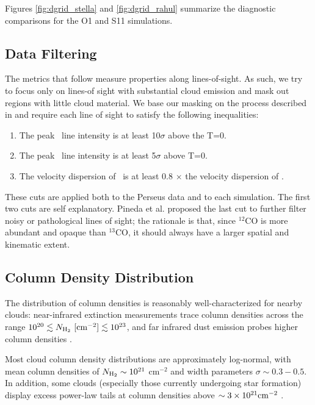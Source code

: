 Figures \ref{fig:dgrid_stella} and \ref{fig:dgrid_rahul} summarize the diagnostic comparisons for the O1 and S11 simulations.

\subsection{Data Filtering}
The metrics that follow measure properties along lines-of-sight. As such, we try to focus only on lines-of sight with substantial cloud emission and mask out
regions with little cloud material. We base our masking on the process described in \cite{http://adsabs.harvard.edu/abs/2008ApJ...679..481P} and require
each line of sight to satisfy the following inequalities:

\begin{enumerate}
\item The peak  \coa\, line intensity is at least 10$\sigma$ above the T=0.
\item The peak \coc\, line intensity is at least 5$\sigma$ above T=0.
\item The velocity dispersion of \coa\, is at least 0.8 $\times$ the velocity dispersion of \coc.
\end{enumerate}

These cuts are applied both to the Perseus data and to each simulation. The first two cuts are self explanatory. Pineda et al. proposed the last cut to further filter noisy or pathological lines of sight; the rationale is that, since $^{12}$CO is more abundant and opaque than $^{13}$CO, it should always have a larger spatial and kinematic extent.

\subsection{Column Density Distribution}
The distribution of column densities is reasonably well-characterized for nearby clouds: near-infrared extinction measurements trace column densities
across the range $10^{20} \lesssim N_{\rm H_2}~  [{\rm cm}^{-2}]  \lesssim 10^{23} $, and far infrared dust emission probes higher column densities \citep{http://adsabs.harvard.edu/abs/2009ApJ...692...91G, http://adsabs.harvard.edu/abs/2012ApJ...752...55K, 2009A&A...493..735L, 2009A&A...508L..35K}.

Most cloud column density distributions are approximately log-normal, with mean column densities of $N_{\rm H_2} \sim 10^{21}$ cm$^{-2}$ and width parameters $\sigma \sim 0.3-0.5$. In addition, some clouds (especially those currently undergoing star formation) display excess power-law tails at column densities above $\sim 3 \times 10^{21} {\rm cm}^{-2}$  \citep{http://adsabs.harvard.edu/abs/2009ApJ...692...91G, 2009A&A...508L..35K}.

